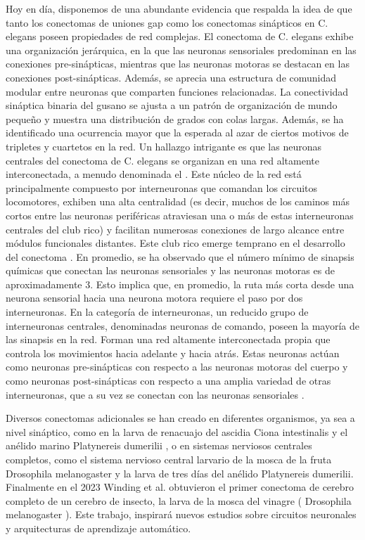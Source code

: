 Hoy en día, disponemos de una abundante evidencia que respalda la idea de que tanto los conectomas de uniones gap como los conectomas sinápticos en C. elegans poseen propiedades de red complejas. El conectoma de C. elegans exhibe una organización jerárquica, en la que las neuronas sensoriales predominan en las conexiones pre-sinápticas, mientras que las neuronas motoras se destacan en las conexiones post-sinápticas. Además, se aprecia una estructura de comunidad modular entre neuronas que comparten funciones relacionadas. La conectividad sináptica binaria del gusano se ajusta a un patrón de organización de mundo pequeño y muestra una distribución de grados con colas largas. Además, se ha identificado una ocurrencia mayor que la esperada al azar de ciertos motivos de tripletes y cuartetos en la red. Un hallazgo intrigante es que las neuronas centrales del conectoma de C. elegans se organizan en una red altamente interconectada, a menudo denominada el . Este núcleo de la red está principalmente compuesto por interneuronas que comandan los circuitos locomotores, exhiben una alta centralidad (es decir, muchos de los caminos más cortos entre las neuronas periféricas atraviesan una o más de estas interneuronas centrales del club rico) y facilitan numerosas conexiones de largo alcance entre módulos funcionales distantes. Este club rico emerge temprano en el desarrollo del conectoma \cite{schroter_micro-connectomics_2017}.  En promedio, se ha observado que el número mínimo de sinapsis químicas que conectan las neuronas sensoriales y las neuronas motoras es de aproximadamente 3. Esto implica que, en promedio, la ruta más corta desde una neurona sensorial hacia una neurona motora requiere el paso por dos interneuronas. En la categoría de interneuronas, un reducido grupo de interneuronas centrales, denominadas neuronas de comando, poseen la mayoría de las sinapsis en la red. Forman una red altamente interconectada propia que controla los movimientos hacia adelante y hacia atrás. Estas neuronas actúan como neuronas pre-sinápticas con respecto a las neuronas motoras del cuerpo y como neuronas post-sinápticas con respecto a una amplia variedad de otras interneuronas, que a su vez se conectan con las neuronas sensoriales \cite{flavell_dynamic_2022}. 


Diversos conectomas adicionales se han creado en diferentes organismos, ya sea a nivel sináptico, como en la larva de renacuajo del ascidia Ciona intestinalis \cite{ryan_cns_2016} y el anélido marino Platynereis dumerilii \cite{veraszto_whole-animal_2020}, o en sistemas nerviosos centrales completos, como el sistema nervioso central larvario de la mosca de la fruta Drosophila melanogaster \cite{scheffer_connectome_2020} y la larva de tres días del anélido Platynereis dumerilii. Finalmente en el 2023  Winding et al.  \cite{winding_connectome_2023}  obtuvieron el primer conectoma de cerebro completo de un cerebro de insecto, la larva de la mosca del vinagre ( Drosophila melanogaster ). Este  trabajo,  inspirará nuevos estudios sobre circuitos neuronales y arquitecturas de aprendizaje automático.

